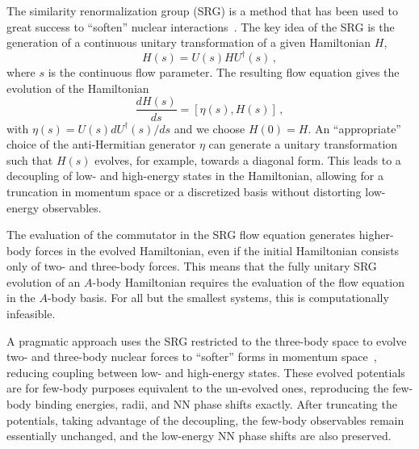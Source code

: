 The similarity renormalization group (SRG) is a method that has been used to great success to ``soften'' nuclear interactions~\cite{Bogn06srg,Wegn94srg,Glaz93srg}.
The key idea of the SRG is the generation of a continuous unitary transformation of a given Hamiltonian $H$,
\begin{equation}
  H(s) = U(s) H U^{\dagger}(s)\,,
\end{equation}
where $s$ is the continuous flow parameter.
The resulting flow equation gives the evolution of the Hamiltonian
\begin{equation}\label{eq:srg_flow_eq}
  \frac{d H(s)}{ds} = [\eta(s), H(s)]\,,
\end{equation}
with $\eta(s) = U(s) d U^{\dagger}(s)/ ds$ and we choose $H(0) = H$.
An ``appropriate'' choice of the anti-Hermitian generator $\eta$
can generate a unitary transformation
such that $H(s)$ evolves, for example, towards a diagonal form.
This leads to a decoupling of low- and high-energy states in the Hamiltonian,
allowing for a truncation in momentum space or a discretized basis
without distorting low-energy observables.

The evaluation of the commutator in the SRG flow equation generates higher-body forces in the evolved Hamiltonian,
even if the initial Hamiltonian consists only of two- and three-body forces.
This means that the fully unitary SRG evolution of an $A$-body Hamiltonian
requires the evaluation of the flow equation in the $A$-body basis.
For all but the smallest systems, this is computationally infeasible.

A pragmatic approach uses the SRG restricted to the three-body space
to evolve two- and three-body nuclear forces to ``softer'' forms in momentum space~\cite{Hebe12srg3n},
reducing coupling between low- and high-energy states.
These evolved potentials are for few-body purposes equivalent to the un-evolved ones,
reproducing the few-body binding energies, radii, and NN phase shifts exactly.
After truncating the potentials, taking advantage of the decoupling,
the few-body observables remain essentially unchanged,
and the low-energy NN phase shifts are also preserved.

